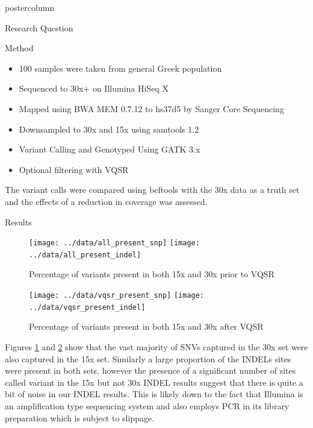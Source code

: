\documentclass[final,xcolor=table]{beamer}
\begin{document}
\begin{frame}{}
\begin{columns}
\begin{column}{.49\textwidth}
\begin{beamercolorbox}[center,wd=\textwidth]{postercolumn}
\begin{minipage}[T]{.95\textwidth}
\begin{block}{Research Question}
\begin{figure}
\begin{tikzpicture}[node distance=5.5cm]
\end{tikzpicture}
\end{figure}
            \end{block}
            \begin{block}{Method}
                \begin{itemize} 
                    \item 100 samples were taken from general Greek population
                    \item Sequenced to 30x+ on Illumina HiSeq X
                    \item Mapped using BWA MEM 0.7.12 to hs37d5 by Sanger Core Sequencing
                    \item Downsampled to 30x and 15x using samtools 1.2
                    \item Variant Calling and Genotyped Using GATK 3.x
                    \item Optional filtering with VQSR
                \end{itemize}
                The variant calls were compared using bcftools with the 30x data as a truth set and the effects of a reduction in coverage was assessed.
            \end{block}
            \begin{block}{Results}
                \begin{figure}
                \texttt{[image: ../data/all\_present\_snp]}
                \texttt{[image: ../data/all\_present\_indel]}
                \caption{Percentage of variants present in both 15x and 30x prior to VQSR}
                \label{fig:all_present}
                \end{figure}

                \begin{figure}
                \texttt{[image: ../data/vqsr\_present\_snp]}
                \texttt{[image: ../data/vqsr\_present\_indel]}
                \caption{Percentage of variants present in both 15x and 30x after VQSR}
                \label{fig:vqsr_present}
                \end{figure}

Figures \ref{fig:all_present} and \ref{fig:vqsr_present} show that the vast majority of SNVs captured in the 30x set were also captured in the 15x set. Similarly a large proportion of the INDELs sites were present in both sets, however the presence of a significant number of sites called variant in the 15x but not 30x INDEL results suggest that there is quite a bit of noise in our INDEL results. This is likely down to the fact that Illumina is an amplification type sequencing system and also employs PCR in its library preparation which is subject to slippage.


\end{block}
\end{minipage}
\end{beamercolorbox}
\end{column}
\end{columns}
\end{frame}
\end{document}
